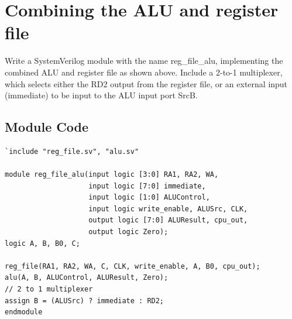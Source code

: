 \documentclass{article}
\begin{document}
\newpage
\section{Combining the ALU and register file}
Write a SystemVerilog module with the name reg\_file\_alu, implementing the combined ALU and register file as shown above.
Include a 2-to-1 multiplexer, which selects either the RD2 output from the register file, or an external input (immediate) to be input to the ALU input port SrcB.

\subsection{Module Code}
\begin{lstlisting}
`include "reg_file.sv", "alu.sv"

module reg_file_alu(input logic [3:0] RA1, RA2, WA,
                    input logic [7:0] immediate,
                    input logic [1:0] ALUControl,
                    input logic write_enable, ALUSrc, CLK,
                    output logic [7:0] ALUResult, cpu_out,
                    output logic Zero);
logic A, B, B0, C;

reg_file(RA1, RA2, WA, C, CLK, write_enable, A, B0, cpu_out);
alu(A, B, ALUControl, ALUResult, Zero);
// 2 to 1 multiplexer
assign B = (ALUSrc) ? immediate : RD2;
endmodule

\end{lstlisting}
\end{document}
